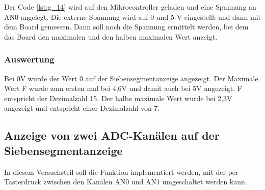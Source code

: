 \documentclass[12pt,a4paper]{article}
\begin{document}
Der Code \ref{lst:g_14} wird auf den Mikrocontroller geladen und eine Spannung an AN0 angelegt. Die externe Spannung wird auf 0 und 5 V eingestellt und dann mit dem Board gemessen. Dann soll noch die Spannung ermittelt werden, bei dem das  Board den maximalen und den halben maximalen Wert anzeigt.

\subsubsection*{Auswertung}

Bei 0V wurde der Wert 0 auf der Siebensegmentanzeige angezeigt. Der Maximale Wert F wurde zum ersten mal bei 4,6V und damit auch bei 5V angezeigt. F entspricht der Dezimalzahl 15. Der halbe maximale Wert wurde bei 2,3V angezeigt und entspricht einer Dezimalzahl von 7.

\subsection{Anzeige von zwei ADC-Kanälen auf der Siebensegmentanzeige}

In diesem Versuchsteil soll die Funktion implementiert werden, mit der per Tasterdruck zwischen den Kanälen AN0 und AN1 umgeschaltet werden kann.
\end{document}
